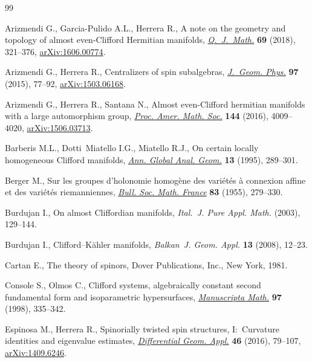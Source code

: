\documentclass[10pt,a4paper]{amsart}
\numberwithin{equation}{section}
\begin{document}
\begin{thebibliography}{99}
\footnotesize\itemsep=0pt

Arizmendi G., Garcia-Pulido A.L., Herrera R., A note on the geometry and
 topology of almost even-{C}lifford {H}ermitian manifolds,
 \href{https://doi.org/10.1093/qmath/hax040}{\textit{Q.~J.~Math.}} \textbf{69} (2018), 321--376, \href{https://arxiv.org/abs/1606.00774}{arXiv:1606.00774}.

Arizmendi G., Herrera R., Centralizers of spin subalgebras, \href{https://doi.org/10.1016/j.geomphys.2015.07.002}{\textit{J.~Geom.
 Phys.}} \textbf{97} (2015), 77--92, \href{https://arxiv.org/abs/1503.06168}{arXiv:1503.06168}.

Arizmendi G., Herrera R., Santana N., Almost even-{C}lifford hermitian
 manifolds with a large automorphism group, \href{https://doi.org/10.1090/proc/13071}{\textit{Proc. Amer. Math. Soc.}}
 \textbf{144} (2016), 4009--4020, \href{https://arxiv.org/abs/1506.03713}{arXiv:1506.03713}.

Barberis M.L., Dotti~Miatello I.G., Miatello R.J., On certain locally
 homogeneous {C}lifford manifolds, \href{https://doi.org/10.1007/BF00773661}{\textit{Ann. Global Anal. Geom.}}
 \textbf{13} (1995), 289--301.

Berger M., Sur les groupes d'holonomie homog\`ene des vari\'{e}t\'{e}s \`a
 connexion affine et des vari\'{e}t\'{e}s riemanniennes, \href{https://doi.org/10.24033/bsmf.1464}{\textit{Bull. Soc.
 Math. France}} \textbf{83} (1955), 279--330.

Burdujan I., On almost {C}liffordian manifolds, \textit{Ital.~J. Pure Appl.
 Math.} (2003), 129--144.

Burdujan I., Clifford--{K}\"{a}hler manifolds, \textit{Balkan~J. Geom. Appl.}
 \textbf{13} (2008), 12--23.

Cartan E., The theory of spinors, Dover Publications, Inc., New York, 1981.

Console S., Olmos C., Clifford systems, algebraically constant second
 fundamental form and isoparametric hypersurfaces, \href{https://doi.org/10.1007/s002290050106}{\textit{Manuscripta Math.}}
 \textbf{97} (1998), 335--342.

Espinosa M., Herrera R., Spinorially twisted spin structures, {I}:~{C}urvature
 identities and eigenvalue estimates, \href{https://doi.org/10.1016/j.difgeo.2016.01.008}{\textit{Differential Geom. Appl.}}
 \textbf{46} (2016), 79--107, \href{https://arxiv.org/abs/1409.6246}{arXiv:1409.6246}.


\end{thebibliography}
\end{document}
